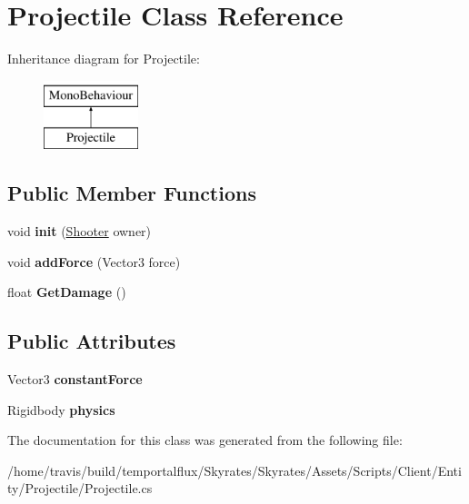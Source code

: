 \hypertarget{class_projectile}{\section{Projectile Class Reference}
\label{class_projectile}
}
Inheritance diagram for Projectile\-:\begin{figure}[H]
\begin{center}
\leavevmode
\includegraphics[height=2.000000cm]{class_projectile}
\end{center}
\end{figure}
\subsection*{Public Member Functions}
\begin{DoxyCompactItemize}
\item 
\hypertarget{class_projectile_a3465c1a31c55962af708b90717f6e451}{void {\bfseries init} (\hyperlink{class_shooter}{Shooter} owner)}\label{class_projectile_a3465c1a31c55962af708b90717f6e451}

\item 
\hypertarget{class_projectile_ae1941a0ed77ae0de87a25594e36d1294}{void {\bfseries add\-Force} (Vector3 force)}\label{class_projectile_ae1941a0ed77ae0de87a25594e36d1294}

\item 
\hypertarget{class_projectile_abaa4365575e7be77f8214bf665b0cc50}{float {\bfseries Get\-Damage} ()}\label{class_projectile_abaa4365575e7be77f8214bf665b0cc50}

\end{DoxyCompactItemize}
\subsection*{Public Attributes}
\begin{DoxyCompactItemize}
\item 
\hypertarget{class_projectile_a330fc169fac1e4007ada5e08e9ae2f87}{Vector3 {\bfseries constant\-Force}}\label{class_projectile_a330fc169fac1e4007ada5e08e9ae2f87}

\item 
\hypertarget{class_projectile_a927ff3dc840abdaf004b9dbc44f0b76b}{Rigidbody {\bfseries physics}}\label{class_projectile_a927ff3dc840abdaf004b9dbc44f0b76b}

\end{DoxyCompactItemize}


The documentation for this class was generated from the following file\-:\begin{DoxyCompactItemize}
\item 
/home/travis/build/temportalflux/\-Skyrates/\-Skyrates/\-Assets/\-Scripts/\-Client/\-Entity/\-Projectile/Projectile.\-cs\end{DoxyCompactItemize}
